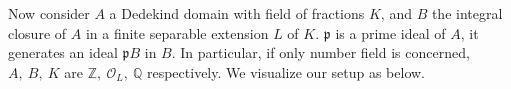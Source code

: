 \noindent
Now consider $A$ a Dedekind domain with field of fractions $K$, and $B$ the integral closure of $A$ in a finite separable extension $L$ of $K$. $\mathfrak{p}$ is a prime ideal of $A$, it generates an ideal $\mathfrak{p}B$ in $B$. In particular, if only number field is concerned, $A, \ B, \ K$ are $\mathbb{Z}, \ \mathcal{O}_L, \ \mathbb{Q}$ respectively. We visualize our setup as below.
\newline

